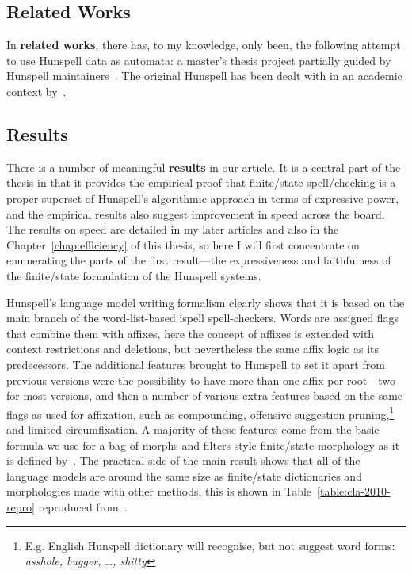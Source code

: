 \documentclass[officiallayout,final]{unihelcompling}
\begin{document}
\subsection{Related Works}

In \textbf{related works}, there has, to my knowledge, only been, the following
attempt to use Hunspell data as automata: a master's thesis project partially
guided by Hunspell maintainers~\citep{greenfield2010open}.
The
original Hunspell has been dealt with in an academic context 
by~\citet{tron2005hunmorph}.

\subsection{Results}

There is a number of meaningful \textbf{results} in our article. It
is a central part of the thesis in that it provides the empirical proof that
finite\-/state spell\-/checking is a proper superset of Hunspell's algorithmic 
approach in terms of expressive power, and the empirical results also suggest
improvement in speed across the board. The results on speed are detailed in my
later articles and also in the Chapter~\ref{chap:efficiency} of this thesis,
so here I will first concentrate on enumerating the parts of the first
result---the expressiveness and faithfulness of the finite\-/state formulation of
the Hunspell systems.

Hunspell's language model writing formalism clearly shows that it is based on
the main branch of the word-list-based ispell spell-checkers. Words are
assigned flags that combine them with affixes, here the concept of affixes is
extended with context restrictions and deletions, but nevertheless the same
affix logic as its predecessors. The additional features brought to Hunspell to
set it apart from previous versions were the possibility to have more than one
affix per root---two for most versions, and then a number of various extra
features based on the same flags as used for affixation, such as compounding,
offensive suggestion pruning,\footnote{E.g. English Hunspell dictionary will
    recognise, but not suggest word forms: \emph{asshole, bugger, \ldots,
shitty}} and limited circumfixation.  A majority of these features come from
the basic formula we use for a bag of morphs and filters style finite\-/state
morphology as it is defined by~\citet{linden2009hfst}. The practical side of
the main result shows that all of the language models are around the same size
as finite\-/state dictionaries and morphologies made with other methods, this
is shown in Table~\ref{table:cla-2010-repro} reproduced
from~.
\end{document}
